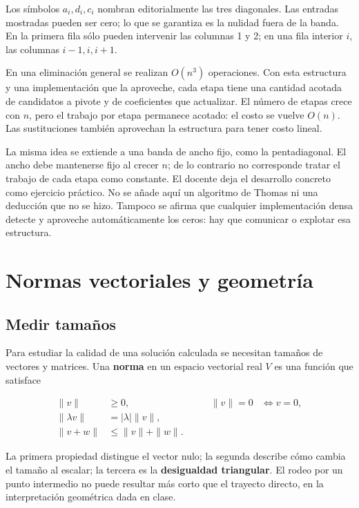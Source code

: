 \documentclass[12pt,a4paper]{article}
\begin{document}
Los símbolos $a_i,d_i,c_i$ nombran editorialmente las tres diagonales. Las entradas mostradas pueden ser cero; lo que se garantiza es la nulidad fuera de la banda. En la primera fila sólo pueden intervenir las columnas 1 y 2; en una fila interior $i$, las columnas $i-1,i,i+1$.

En una eliminación general se realizan $O(n^3)$ operaciones. Con esta estructura y una implementación que la aproveche, cada etapa tiene una cantidad acotada de candidatos a pivote y de coeficientes que actualizar. El número de etapas crece con $n$, pero el trabajo por etapa permanece acotado: el costo se vuelve $O(n)$. Las sustituciones también aprovechan la estructura para tener costo lineal.

La misma idea se extiende a una banda de ancho fijo, como la pentadiagonal. El ancho debe mantenerse fijo al crecer $n$; de lo contrario no corresponde tratar el trabajo de cada etapa como constante. El docente deja el desarrollo concreto como ejercicio práctico. No se añade aquí un algoritmo de Thomas ni una deducción que no se hizo. Tampoco se afirma que cualquier implementación densa detecte y aproveche automáticamente los ceros: hay que comunicar o explotar esa estructura.

\section{Normas vectoriales y geometría}

\subsection{Medir tamaños}

Para estudiar la calidad de una solución calculada se necesitan tamaños de vectores y matrices. Una \textbf{norma} en un espacio vectorial real $V$ es una función que satisface

\[
\begin{aligned}
\|v\|&\ge0,&\qquad \|v\|=0&\iff v=0,\\
\|\lambda v\|&=|\lambda|\|v\|,\\
\|v+w\|&\le\|v\|+\|w\|.
\end{aligned}
\]

La primera propiedad distingue el vector nulo; la segunda describe cómo cambia el tamaño al escalar; la tercera es la \textbf{desigualdad triangular}. El rodeo por un punto intermedio no puede resultar más corto que el trayecto directo, en la interpretación geométrica dada en clase.
\end{document}
